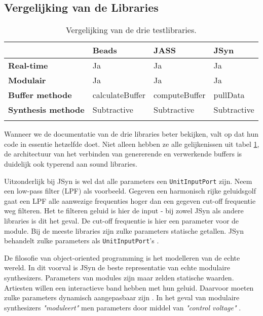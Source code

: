 \subsection*{Vergelijking van de Libraries}
\label{subsec:vergelijkinglibraries}

\begin{longtable}[c]{l|lll}
         & \textbf{Beads} & \textbf{JASS} & \textbf{JSyn} \\ \hline
        \textbf{Real-time} & Ja & Ja & Ja \\
        \textbf{Modulair} & Ja & Ja & Ja \\
        \textbf{Buffer methode} & calculateBuffer & computeBuffer & pullData \\
        \textbf{Synthesis methode} & Subtractive & Subtractive & Subtractive \\
    \caption{Vergelijking van de drie testlibraries.}
    \label{tab:vergelijking}
\end{longtable}

Wanneer we de documentatie van de drie libraries beter bekijken, valt op dat hun code in essentie hetzelfde doet. Niet alleen hebben ze alle gelijkenissen uit tabel \ref{tab:vergelijking}, de architectuur van het verbinden van genererende en verwerkende buffers is duidelijk ook typerend aan sound libraries.

Uitzonderlijk bij JSyn is wel dat alle parameters een \verb+UnitInputPort+ zijn. Neem een low-pass filter (LPF) als voorbeeld. Gegeven een harmonisch rijke geluidsgolf gaat een LPF alle aanwezige frequenties hoger dan een gegeven cut-off frequentie weg filteren. Het te filteren geluid is hier de input - bij zowel JSyn als andere libraries is dit het geval. De cut-off frequentie is hier een parameter voor de module.\newline
Bij de meeste libraries zijn zulke parameters statische getallen. JSyn behandelt zulke parameters als \verb+UnitInputPort+'s \autocite{jsyndocs}.

De filosofie van object-oriented programming is het modelleren van de echte wereld. In dit voorval is JSyn de beste representatie van echte modulaire synthesizers. Parameters van modules zijn maar zelden statische waarden. Artiesten willen een interactieve band hebben met hun geluid. Daarvoor moeten zulke parameters dynamisch aangepasbaar zijn \autocite{vagabundos}. In het geval van modulaire synthesizers \textit{"moduleert"} men parameters door middel van \textit{"control voltage"} \autocite{modular}.

